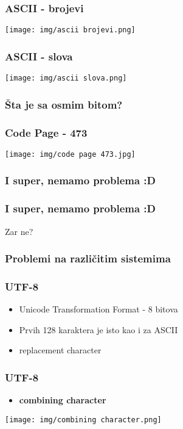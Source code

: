 \documentclass{beamer}
\begin{document}
\begin{frame}
  \frametitle{ASCII - brojevi}
  \begin{center}
    \texttt{[image: img/ascii brojevi.png]}
  \end{center}
\end{frame}

\begin{frame}
  \frametitle{ASCII - slova}
  \begin{center}
    \texttt{[image: img/ascii slova.png]}
  \end{center}
\end{frame}

\begin{frame}
  \frametitle{Šta je sa osmim bitom?}
\end{frame}

\begin{frame}
  \frametitle{Code Page - 473}
  \begin{center}
    \texttt{[image: img/code page 473.jpg]}
  \end{center}
\end{frame}

\begin{frame}
  \frametitle{I super, nemamo problema :D }
\end{frame}

\begin{frame}
  \frametitle{I super, nemamo problema :D }
  Zar ne?
\end{frame}

\begin{frame}
  \frametitle{Problemi na različitim sistemima}
\end{frame}

\begin{frame}
  \frametitle{UTF-8}
  \begin{itemize}
    \item Unicode Transformation Format - 8 bitova \newline
    \item Prvih 128 karaktera je isto kao i za ASCII \newline
    \item replacement character %
  \end{itemize}
\end{frame}

\begin{frame}
  \frametitle{UTF-8}
  \begin{itemize}
    \item \textbf{combining character} \newline
  \end{itemize}
  \begin{center}
    \texttt{[image: img/combining character.png]}
  \end{center}
\end{frame}
\end{document}

